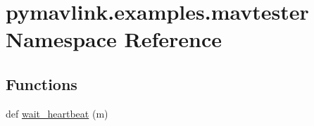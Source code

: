 \hypertarget{namespacepymavlink_1_1examples_1_1mavtester}{}\section{pymavlink.\+examples.\+mavtester Namespace Reference}
\label{namespacepymavlink_1_1examples_1_1mavtester}
\subsection*{Functions}
\begin{DoxyCompactItemize}
\item 
def \hyperlink{namespacepymavlink_1_1examples_1_1mavtester_ae1bf609bf03b42c2ed744e90dbb30db3}{wait\+\_\+heartbeat} (m)
\end{DoxyCompactItemize}
